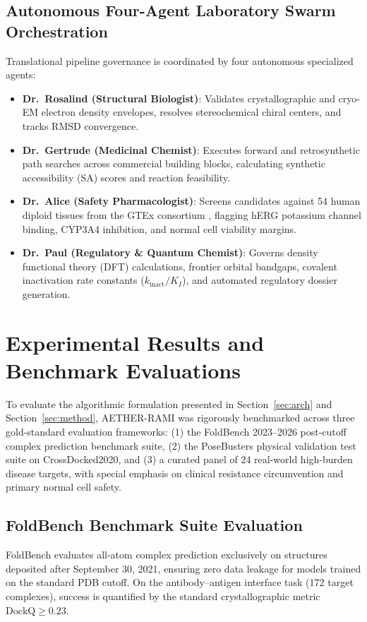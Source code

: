 \documentclass[10pt,journal,compsoc]{IEEEtran}
\begin{document}
\subsection{Autonomous Four-Agent Laboratory Swarm Orchestration}
Translational pipeline governance is coordinated by four autonomous specialized agents:
\begin{itemize}
    \item \textbf{Dr.~Rosalind (Structural Biologist)}: Validates crystallographic and cryo-EM electron density envelopes, resolves stereochemical chiral centers, and tracks RMSD convergence.
    \item \textbf{Dr.~Gertrude (Medicinal Chemist)}: Executes forward and retrosynthetic path searches across commercial building blocks, calculating synthetic accessibility (SA) scores and reaction feasibility.
    \item \textbf{Dr.~Alice (Safety Pharmacologist)}: Screens candidates against 54 human diploid tissues from the GTEx consortium \cite{gtex2020genotype}, flagging hERG potassium channel binding, CYP3A4 inhibition, and normal cell viability margins.
    \item \textbf{Dr.~Paul (Regulatory \& Quantum Chemist)}: Governs density functional theory (DFT) calculations, frontier orbital bandgaps, covalent inactivation rate constants ($k_{\text{inact}} / K_I$), and automated regulatory dossier generation.
\end{itemize}
\section{Experimental Results and Benchmark Evaluations}
\label{sec:results}
To evaluate the algorithmic formulation presented in Section~\ref{sec:arch} and Section~\ref{sec:method}, AETHER-RAMI was rigorously benchmarked across three gold-standard evaluation frameworks: (1) the FoldBench 2023--2026 post-cutoff complex prediction benchmark suite, (2) the PoseBusters physical validation test suite on CrossDocked2020, and (3) a curated panel of 24 real-world high-burden disease targets, with special emphasis on clinical resistance circumvention and primary normal cell safety.

\subsection{FoldBench Benchmark Suite Evaluation}
FoldBench evaluates all-atom complex prediction exclusively on structures deposited after September 30, 2021, ensuring zero data leakage for models trained on the standard PDB cutoff. On the antibody--antigen interface task (172 target complexes), success is quantified by the standard crystallographic metric $\text{DockQ} \ge 0.23$.
\end{document}
